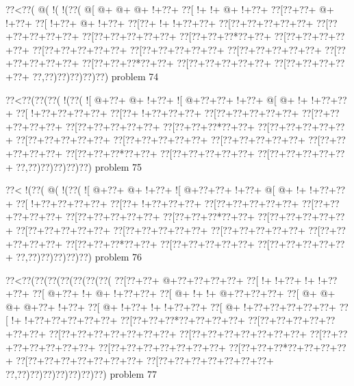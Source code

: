 \vbox{\vbox{\goo
\0??<\0??(\- @(\- !(\- !(\0??(
\- @[\- @+\- @+\- @+\- !+\0??+
\0??[\- !+\- !+\- @+\- !+\0??+
\0??[\0??+\0??+\- @+\- !+\0??+
\0??[\- !+\0??+\- @+\- !+\0??+
\0??[\0??+\- !+\- !+\0??+\0??+
\0??[\0??+\0??+\0??+\0??+\0??+
\0??[\0??+\0??+\0??+\0??+\0??+
\0??[\0??+\0??+\0??+\0??+\0??+
\0??[\0??+\0??+\0??*\0??+\0??+
\0??[\0??+\0??+\0??+\0??+\0??+
\0??[\0??+\0??+\0??+\0??+\0??+
\0??[\0??+\0??+\0??+\0??+\0??+
\0??[\0??+\0??+\0??+\0??+\0??+
\0??[\0??+\0??+\0??+\0??+\0??+
\0??[\0??+\0??+\0??*\0??+\0??+
\0??[\0??+\0??+\0??+\0??+\0??+
\0??[\0??+\0??+\0??+\0??+\0??+
\0??,\0??)\0??)\0??)\0??)\0??)
}
\hfil problem 74\hfil\break
}

\vbox{\vbox{\goo
\0??<\0??(\0??(\0??(\- !(\0??(
\- ![\- @+\0??+\- @+\- !+\0??+
\- ![\- @+\0??+\0??+\- !+\0??+
\- @[\- @+\- !+\- !+\0??+\0??+
\0??[\- !+\0??+\0??+\0??+\0??+
\0??[\0??+\- !+\0??+\0??+\0??+
\0??[\0??+\0??+\0??+\0??+\0??+
\0??[\0??+\0??+\0??+\0??+\0??+
\0??[\0??+\0??+\0??+\0??+\0??+
\0??[\0??+\0??+\0??*\0??+\0??+
\0??[\0??+\0??+\0??+\0??+\0??+
\0??[\0??+\0??+\0??+\0??+\0??+
\0??[\0??+\0??+\0??+\0??+\0??+
\0??[\0??+\0??+\0??+\0??+\0??+
\0??[\0??+\0??+\0??+\0??+\0??+
\0??[\0??+\0??+\0??*\0??+\0??+
\0??[\0??+\0??+\0??+\0??+\0??+
\0??[\0??+\0??+\0??+\0??+\0??+
\0??,\0??)\0??)\0??)\0??)\0??)
}
\hfil problem 75\hfil\break
}

\vbox{\vbox{\goo
\0??<\- !(\0??(\- @(\- !(\0??(
\- ![\- @+\0??+\- @+\- !+\0??+
\- ![\- @+\0??+\0??+\- !+\0??+
\- @[\- @+\- !+\- !+\0??+\0??+
\0??[\- !+\0??+\0??+\0??+\0??+
\0??[\0??+\- !+\0??+\0??+\0??+
\0??[\0??+\0??+\0??+\0??+\0??+
\0??[\0??+\0??+\0??+\0??+\0??+
\0??[\0??+\0??+\0??+\0??+\0??+
\0??[\0??+\0??+\0??*\0??+\0??+
\0??[\0??+\0??+\0??+\0??+\0??+
\0??[\0??+\0??+\0??+\0??+\0??+
\0??[\0??+\0??+\0??+\0??+\0??+
\0??[\0??+\0??+\0??+\0??+\0??+
\0??[\0??+\0??+\0??+\0??+\0??+
\0??[\0??+\0??+\0??*\0??+\0??+
\0??[\0??+\0??+\0??+\0??+\0??+
\0??[\0??+\0??+\0??+\0??+\0??+
\0??,\0??)\0??)\0??)\0??)\0??)
}
\hfil problem 76\hfil\break
}

\vbox{\vbox{\goo
\0??<\0??(\0??(\0??(\0??(\0??(\0??(\0??(
\0??[\0??+\0??+\- @+\0??+\0??+\0??+\0??+
\0??[\- !+\- !+\0??+\- !+\- !+\0??+\0??+
\0??[\- @+\0??+\- !+\- @+\- !+\0??+\0??+
\0??[\- @+\- !+\- !+\- @+\0??+\0??+\0??+
\0??[\- @+\- @+\- @+\- @+\0??+\- !+\0??+
\0??[\- @+\- !+\0??+\- !+\- !+\0??+\0??+
\0??[\- @+\- !+\0??+\0??+\0??+\0??+\0??+
\0??[\- !+\- !+\0??+\0??+\0??+\0??+\0??+
\0??[\0??+\0??+\0??*\0??+\0??+\0??+\0??+
\0??[\0??+\0??+\0??+\0??+\0??+\0??+\0??+
\0??[\0??+\0??+\0??+\0??+\0??+\0??+\0??+
\0??[\0??+\0??+\0??+\0??+\0??+\0??+\0??+
\0??[\0??+\0??+\0??+\0??+\0??+\0??+\0??+
\0??[\0??+\0??+\0??+\0??+\0??+\0??+\0??+
\0??[\0??+\0??+\0??*\0??+\0??+\0??+\0??+
\0??[\0??+\0??+\0??+\0??+\0??+\0??+\0??+
\0??[\0??+\0??+\0??+\0??+\0??+\0??+\0??+
\0??,\0??)\0??)\0??)\0??)\0??)\0??)\0??)
}
\hfil problem 77\hfil\break
}

